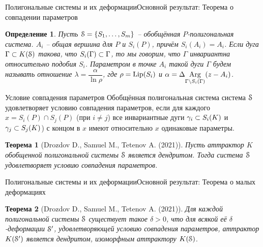 \documentclass[aspectratio=1610, 10pt, notheorems]{beamer}
\newtheorem{theorem}     {Теорема}
\newtheorem{definition}  {Определение}
\begin{document}
\begin{frame}{Полигональные системы и их деформации}{Основной результат: Теорема о совпадении параметров}


\begin{definition}
Пусть ${\EuScript S}=\{S_1,\ldots,S_m\}$ -- обобщённая $P$-полигональная система.
$A_i$ -- общая вершина для $P$ и $S_i(P)$, причём $S_i(A_i)=A_i$.
Если дуга $\Gamma\subset K({\EuScript S})$ такова, что $S_i(\Gamma)\subset\Gamma$, то мы говорим, что $\Gamma$ инвариантна относительно подобия $S_i$.
Параметром в точке $A_i$ такой дуги $\Gamma$ будем называть отношение $\lambda=\dfrac{\alpha}{\ln\rho}$, где $\rho=\mathop{\rm Lip} \nolimits(S_i)$ и $\alpha=\Delta\underset{{\Gamma\setminus S_i(\Gamma)}}{\mathrm {Arg}}(z-A_i)$.
\end{definition}
\begin{block}{Условие совпадения параметров}
Обобщённая полигональная система система ${\EuScript S}$ удовлетворяет условию совпадения параметров, если для каждого $x=S_i(P)\cap S_j(P)$ (при $i\neq j$) все инвариантные дуги $\gamma_i\subset S_i(K)$ и $\gamma_j\subset S_j(K)$) с концом в $x$ имеют относительно $x$ одинаковые параметры.
\end{block}
\begin{theorem}[Drozdov D., Samuel M., Tetenov A. (2021)]
Пусть аттрактор $K$ обобщенной полигональной системы ${\EuScript S}$ является дендритом. 
Тогда система ${\EuScript S}$ удовлетворяет условию совпадения параметров.
\end{theorem}
\end{frame}


\begin{frame}{Полигональные системы и их деформации}{Основной результат: Теорема о малых деформациях}
\begin{theorem}[Drozdov D., Samuel M., Tetenov A. (2021)]
Для каждой полигональной системы ${\EuScript S}$ существует такое $\delta > 0$, что для всякой её $\delta$-деформации ${\EuScript S}'$, удовлетворяющей условию совпадения параметров, аттрактор $K({\EuScript S}')$ является дендритом, изоморфным аттрактору $K({\EuScript S})$.
\end{theorem}
\end{frame}
\end{document}
